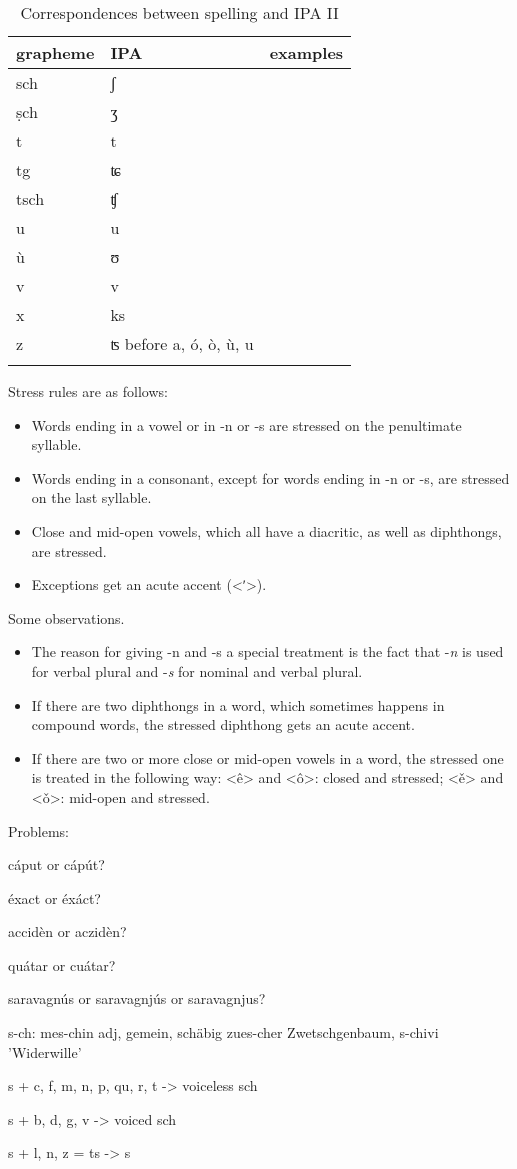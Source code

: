 \begin{table}
\caption{Correspondences between spelling and IPA II}
\label{graphIpaII} 
\begin{tabular}{lll}
    \lsptoprule
        grapheme      & IPA & examples\\
    \midrule  
  sch & ʃ\\
  ṣch & ʒ\\
  t & t\\
  tg& ʨ\\
  tsch & ʧ\\
  u & u\\
  ù & ʊ\\
  v & v\\
  x & ks\\
  z & ʦ before a, ó, ò, ù, u\\
  \lspbottomrule
\end{tabular} 
\end{table}




Stress rules are as follows:

\begin{itemize}
\item Words ending in a vowel or in -n or -s are stressed on the penultimate syllable.
\item Words ending in a consonant, except for words ending in -n or -s, are stressed on the last syllable.
\item Close and mid-open vowels, which all have a diacritic, as well as diphthongs, are stressed. 
\item Exceptions get an acute accent (<ʹ>).
\end{itemize}
      
Some observations.

\begin{itemize}
\item The reason for giving -n and -s a special treatment is the fact that -\textit{n} is used for verbal plural and -\textit{s} for nominal and verbal plural.
\item If there are two diphthongs in a word, which sometimes happens in compound words, the stressed diphthong gets an acute accent.
\item If there are two or more close or mid-open vowels in a word, the stressed one is treated in the following way: <ê> and <ô>: closed and stressed; <ě> and <ǒ>: mid-open and stressed. 
\end{itemize}

Problems:

cáput or cápút?

éxact or éxáct?

accidèn or aczidèn?

quátar or cuátar?

saravagnús or saravagnjús or saravagnjus?

s-ch: mes-chin adj, gemein, schäbig
zues-cher Zwetschgenbaum, s-chivi 'Widerwille'

s + c, f, m, n, p, qu, r, t -> voiceless sch

s + b, d, g, v -> voiced sch

s + l, n, z = ts -> s




